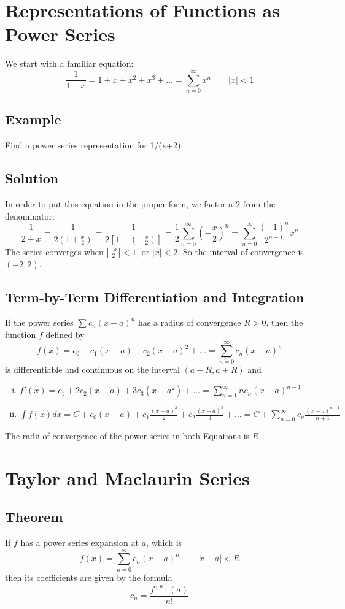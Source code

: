 \section{Representations of Functions as Power Series}

We start with a familiar equation:
$$ \frac{1}{1-x}=1+x+x^2+x^3+\dots=\sum_{n=0}^\infty x^n \qquad |x|<1 $$

\subsection*{Example}
Find a power series representation for 1/(x+2)

\subsection*{Solution}
In order to put this equation in the proper form, we factor a 2 from the denominator:
$$ \frac{1}{2+x}=\frac{1}{2(1+\frac{x}{2})}=\frac{1}{2[1-(-\frac{x}{2})]}=
    \frac{1}{2}\sum_{n=0}^\infty\left(-\frac{x}{2}\right)^n=\sum_{n=0}^\infty\frac{(-1)^n}{2^{n+1}}x^n$$
The series converges when $|\frac{-x}{2}|<1$, or $|x|<2$. So the interval of convergence is $(-2,2)$.

\subsection*{Term-by-Term Differentiation and Integration}
If the power series $\sum c_n(x-a)^n$ has a radius of convergence $R>0$,
then the function $f$ defined by
$$ f(x)=c_0+c_1(x-a)+c_2(x-a)^2+\dots=\sum_{n=0}^\infty c_n(x-a)^n $$
is differentiable and continuous on the interval $(a-R,a+R)$ and
\begin{enumerate}[(i)]
    \item $f'(x)=c_1+2c_2(x-a)+3c_3(x-a^2)+\dots=\sum_{n=1}^\infty nc_n(x-a)^{n-1}$
    \item $\int f(x)dx=C+c_0(x-a)+c_1\frac{(x-a)^2}{2}+c_2\frac{(x-a)^3}{3}+\dots=C+
              \sum_{n=0}^\infty c_n \frac{(x-a)^{n+1}}{n+1}$
\end{enumerate}
The radii of convergence of the power series in both Equations is $R$.

\section{Taylor and Maclaurin Series}

\subsection*{Theorem}
If $f$ has a power series expansion at $a$, which is
$$ f(x)=\sum_{n=0}^\infty c_n(x-a)^n \qquad |x-a|<R $$
then its coefficients are given by the formula
$$ c_n=\frac{f^{(n)}(a)}{n!} $$

